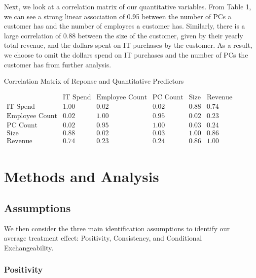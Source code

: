 \documentclass{article}
\begin{document}
Next, we look at a correlation matrix of our quantitative variables. From Table 1, we can see a strong linear association of 0.95 between the number of PCs a customer has and the number of employees a customer has. Similarly, there is a large correlation of 0.88 between the size of the customer, given by their yearly total revenue, and the dollars spent on IT purchases by the customer. As a result, we choose to omit the dollars spend on IT purchases and the number of PCs the customer has from further analysis.

\begin{table}[ht]
\centering
\caption{Correlation Matrix of Reponse and Quantitative Predictors}\medskip
$
\begin{array}{l|ccccccccc}
                  & \text{IT Spend}    & \text{Employee Count}      & \text{PC Count}  & \text{Size}   & \text{Revenue}  \\ \hline
\text{IT Spend}          & 1.00        & 0.02                       & 0.02             & 0.88          & 0.74  \\
\text{Employee Count}    & 0.02        & 1.00                       & 0.95             & 0.02          & 0.23     \\
\text{PC Count}          & 0.02        & 0.95                       & 1.00             & 0.03          & 0.24     \\
\text{Size}              & 0.88        & 0.02                       & 0.03             & 1.00          & 0.86  \\
\text{Revenue}           & 0.74        & 0.23                       & 0.24             & 0.86          & 1.00     \\
\end{array}
$
\end{table}

\section{Methods and Analysis}
\subsection{Assumptions}

We then consider the three main identification assumptions to identify our average treatment effect: Positivity, Consistency, and Conditional Exchangeability.

\subsubsection{Positivity}
\end{document}
